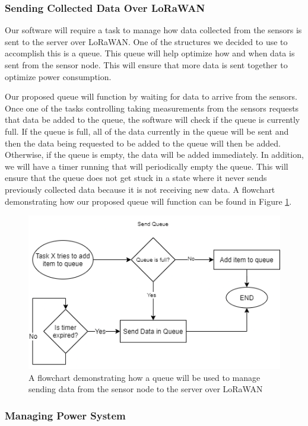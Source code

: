 \subsubsection{Sending Collected Data Over LoRaWAN}
Our software will require a task to manage how data collected from the sensors is sent to the server over LoRaWAN. One of the structures we decided to use to accomplish this is a queue. This queue will help optimize how and when data is sent from the sensor node. This will ensure that more data is sent together to optimize power consumption.

Our proposed queue will function by waiting for data to arrive from the sensors. Once one of the tasks controlling taking measurements from the sensors requests that data be added to the queue, the software will check if the queue is currently full. If the queue is full, all of the data currently in the queue will be sent and then the data being requested to be added to the queue will then be added. Otherwise, if the queue is empty, the data will be added immediately. In addition, we will have a timer running that will periodically empty the queue. This will ensure that the queue does not get stuck in a state where it never sends previously collected data because it is not receiving new data. A flowchart demonstrating how our proposed queue will function can be found in Figure \ref{fig:queue-diagram}.

\begin{figure}[H]
    \centering
    \includegraphics[width=6in]{figures/queue-diagram.png}
    \caption{A flowchart demonstrating how a queue will be used to manage sending data from the sensor node to the server over LoRaWAN}
    \label{fig:queue-diagram} 
\end{figure}

\subsubsection{Managing Power System}